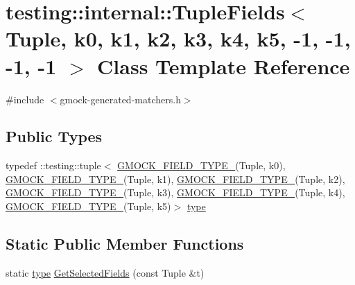\hypertarget{classtesting_1_1internal_1_1TupleFields_3_01Tuple_00_01k0_00_01k1_00_01k2_00_01k3_00_01k4_00_01k15c11b8436218f7eb1523adb30f3f284}{}\section{testing\+::internal\+::Tuple\+Fields$<$ Tuple, k0, k1, k2, k3, k4, k5, -\/1, -\/1, -\/1, -\/1 $>$ Class Template Reference}
\label{classtesting_1_1internal_1_1TupleFields_3_01Tuple_00_01k0_00_01k1_00_01k2_00_01k3_00_01k4_00_01k15c11b8436218f7eb1523adb30f3f284}


{\ttfamily \#include $<$gmock-\/generated-\/matchers.\+h$>$}

\subsection*{Public Types}
\begin{DoxyCompactItemize}
\item 
typedef \+::testing\+::tuple$<$ \mbox{\hyperlink{gmock-generated-matchers_8h_acf3e27de83a73f0d873da1cd471e505b}{G\+M\+O\+C\+K\+\_\+\+F\+I\+E\+L\+D\+\_\+\+T\+Y\+P\+E\+\_\+}}(Tuple, k0), \mbox{\hyperlink{gmock-generated-matchers_8h_acf3e27de83a73f0d873da1cd471e505b}{G\+M\+O\+C\+K\+\_\+\+F\+I\+E\+L\+D\+\_\+\+T\+Y\+P\+E\+\_\+}}(Tuple, k1), \mbox{\hyperlink{gmock-generated-matchers_8h_acf3e27de83a73f0d873da1cd471e505b}{G\+M\+O\+C\+K\+\_\+\+F\+I\+E\+L\+D\+\_\+\+T\+Y\+P\+E\+\_\+}}(Tuple, k2), \mbox{\hyperlink{gmock-generated-matchers_8h_acf3e27de83a73f0d873da1cd471e505b}{G\+M\+O\+C\+K\+\_\+\+F\+I\+E\+L\+D\+\_\+\+T\+Y\+P\+E\+\_\+}}(Tuple, k3), \mbox{\hyperlink{gmock-generated-matchers_8h_acf3e27de83a73f0d873da1cd471e505b}{G\+M\+O\+C\+K\+\_\+\+F\+I\+E\+L\+D\+\_\+\+T\+Y\+P\+E\+\_\+}}(Tuple, k4), \mbox{\hyperlink{gmock-generated-matchers_8h_acf3e27de83a73f0d873da1cd471e505b}{G\+M\+O\+C\+K\+\_\+\+F\+I\+E\+L\+D\+\_\+\+T\+Y\+P\+E\+\_\+}}(Tuple, k5)$>$ \mbox{\hyperlink{classtesting_1_1internal_1_1TupleFields_3_01Tuple_00_01k0_00_01k1_00_01k2_00_01k3_00_01k4_00_01k15c11b8436218f7eb1523adb30f3f284_a4e9aef3e026c3b30cfc21b6776616926}{type}}
\end{DoxyCompactItemize}
\subsection*{Static Public Member Functions}
\begin{DoxyCompactItemize}
\item 
static \mbox{\hyperlink{classtesting_1_1internal_1_1TupleFields_3_01Tuple_00_01k0_00_01k1_00_01k2_00_01k3_00_01k4_00_01k15c11b8436218f7eb1523adb30f3f284_a4e9aef3e026c3b30cfc21b6776616926}{type}} \mbox{\hyperlink{classtesting_1_1internal_1_1TupleFields_3_01Tuple_00_01k0_00_01k1_00_01k2_00_01k3_00_01k4_00_01k15c11b8436218f7eb1523adb30f3f284_a15b4c351182e3b52ec7ce67cb6beb0f8}{Get\+Selected\+Fields}} (const Tuple \&t)
\end{DoxyCompactItemize}


